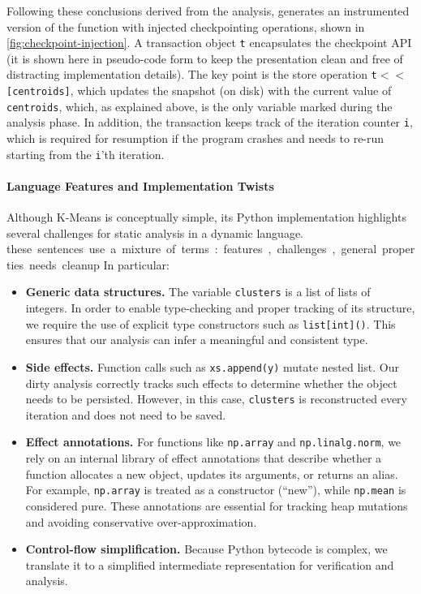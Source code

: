 Following these conclusions derived from the analysis, \spyte generates an instrumented version of the function
with injected checkpointing operations, shown in \autoref{fig:checkpoint-injection}.
A transaction object \lstinline|t| encapsulates the checkpoint API (it is shown here in pseudo-code form to keep the presentation clean and free of distracting implementation details).
The key point is the store operation \lstinline|t|$<\!<$\lstinline|[centroids]|, which updates the snapshot (on disk) with the current value of \lstinline|centroids|, which,
as explained above, is the only variable marked during the analysis phase.
In addition, the transaction keeps track of the iteration counter \lstinline|i|, which is required for resumption if the program crashes and needs to re-run starting from the \lstinline|i|'th iteration.


\paragraph{Language Features and Implementation Twists}

Although K-Means is conceptually simple, its Python implementation highlights several challenges for static analysis in a dynamic language. \si{these sentences use a mixture of terms: features, challenges, general properties. needs cleanup} In particular:
\begin{itemize}
    \item \textbf{Generic data structures.} The variable \texttt{clusters} is a list of lists of integers. In order to enable type-checking and proper tracking of its structure, we require the use of explicit type constructors such as \texttt{list[int]()}. This ensures that our analysis can infer a meaningful and consistent type.
    \item \textbf{Side effects.} Function calls such as \texttt{xs.append(y)} mutate nested list. Our dirty analysis correctly tracks such effects to determine whether the object needs to be persisted. However, in this case, \texttt{clusters} is reconstructed every iteration and does not need to be saved.
    \item \textbf{Effect annotations.} For functions like \texttt{np.array} and \texttt{np.linalg.norm}, we rely on an internal library of effect annotations that describe whether a function allocates a new object, updates its arguments, or returns an alias. For example, \texttt{np.array} is treated as a constructor (``new''), while \texttt{np.mean} is considered pure. These annotations are essential for tracking heap mutations and avoiding conservative over-approximation.
    \item \textbf{Control-flow simplification.} Because Python bytecode is complex, we translate it to a simplified intermediate representation for verification and analysis.
\end{itemize}

